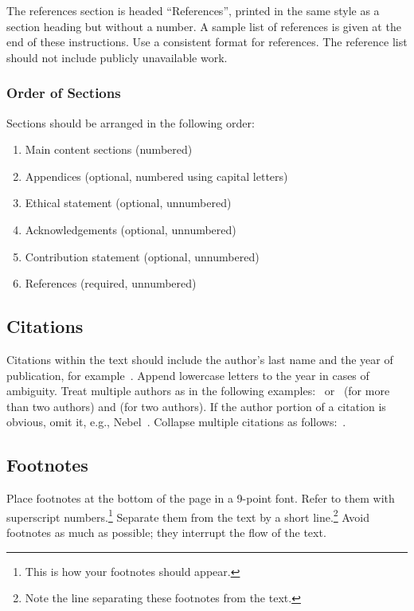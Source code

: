 \documentclass{article}
\begin{document}
The references section is headed ``References'', printed in the same
style as a section heading but without a number. A sample list of
references is given at the end of these instructions. Use a consistent
format for references. The reference list should not include publicly unavailable work.

\subsubsection{Order of Sections}
Sections should be arranged in the following order:
\begin{enumerate}
    \item Main content sections (numbered)
    \item Appendices (optional, numbered using capital letters)
    \item Ethical statement (optional, unnumbered)
    \item Acknowledgements (optional, unnumbered)
    \item Contribution statement (optional, unnumbered)
    \item References (required, unnumbered)
\end{enumerate}

\subsection{Citations}

Citations within the text should include the author's last name and
the year of publication, for example~\cite{gottlob:nonmon}.  Append
lowercase letters to the year in cases of ambiguity.  Treat multiple
authors as in the following examples:~\cite{abelson-et-al:scheme}
or~\cite{bgf:Lixto} (for more than two authors) and
\cite{brachman-schmolze:kl-one} (for two authors).  If the author
portion of a citation is obvious, omit it, e.g.,
Nebel~.  Collapse multiple citations as
follows:~\cite{gls:hypertrees,levesque:functional-foundations}.
\nocite{abelson-et-al:scheme}
\nocite{bgf:Lixto}
\nocite{brachman-schmolze:kl-one}
\nocite{gottlob:nonmon}
\nocite{gls:hypertrees}
\nocite{levesque:functional-foundations}
\nocite{levesque:belief}
\nocite{nebel:jair-2000}

\subsection{Footnotes}

Place footnotes at the bottom of the page in a 9-point font.  Refer to
them with superscript numbers.\footnote{This is how your footnotes
    should appear.} Separate them from the text by a short
line.\footnote{Note the line separating these footnotes from the
    text.} Avoid footnotes as much as possible; they interrupt the flow of
the text.
\end{document}
